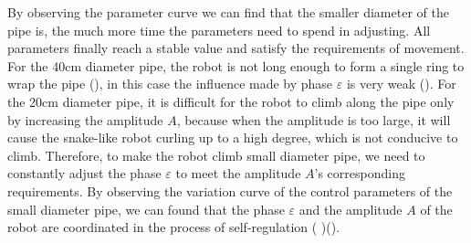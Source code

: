 By observing the parameter curve we can find that the smaller diameter of the pipe is, the much more time the parameters need to spend in adjusting. All parameters finally reach a stable value and satisfy the requirements of movement. For the 40cm diameter pipe, the robot is not long enough to form a single ring to wrap the pipe (), in this case the influence made by phase $\varepsilon$ is very weak (). For the 20cm diameter pipe, it is difficult for the robot to climb along the pipe only by increasing the amplitude $A$, because when the amplitude is too large, it will cause the snake-like robot curling up to a high degree, which is not conducive to climb. Therefore, to make the robot climb small diameter pipe, we need to constantly adjust the phase $\varepsilon$ to meet the amplitude $A$'s corresponding requirements. By observing the variation curve of the control parameters of the small diameter pipe, we can found that the phase $\varepsilon$ and the amplitude $A$ of the robot are coordinated in the process of self-regulation ( )().

